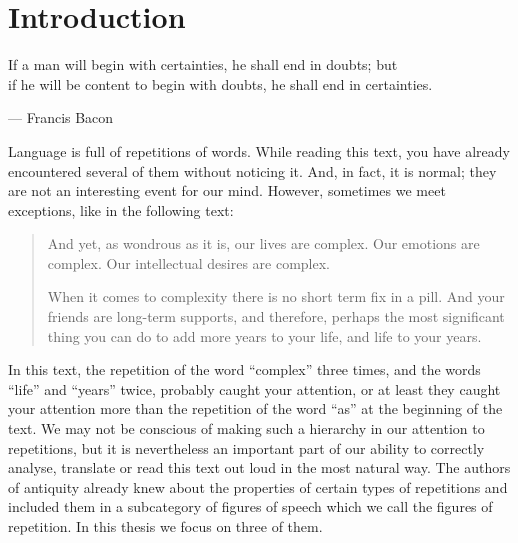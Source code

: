 %
\chapter{Introduction}%
\epigraph{If a man will begin with certainties, he shall end in doubts; but\\ if he will be content to begin with doubts, he shall end in certainties.}{--- Francis Bacon}
\noindent
Language is full of repetitions of words. %
While reading this text, you have already encountered several of them without noticing it. And, in fact, it is normal; %
 they are not an interesting event for our mind. 
However, sometimes we meet exceptions, %
% 
like
  in the following text:
\begin{quotation}
And yet, as wondrous as it is, our lives are complex. 
Our emotions are complex. 
Our intellectual desires are complex.  

 When it comes to complexity there is no short term fix in a pill. %
And your friends are long-term supports, and therefore, perhaps the most significant thing you can do to add more years to your life, and life to your years. %
\end{quotation}

\noindent
In this text, the repetition of the word ``complex'' three times, and the words ``life'' and ``years'' twice, probably caught your attention, or at least they caught your attention more than the repetition of the word ``as'' at the beginning of the text. %
We may not be conscious of making such a hierarchy in our attention to repetitions, but it is nevertheless an important part of our ability to correctly analyse, translate or read this text out loud in the most natural way. The authors of antiquity already knew about the properties of certain types of repetitions and included them in a subcategory of figures of speech which we call the figures of repetition. In this thesis we focus on three of them.
\bigskip

